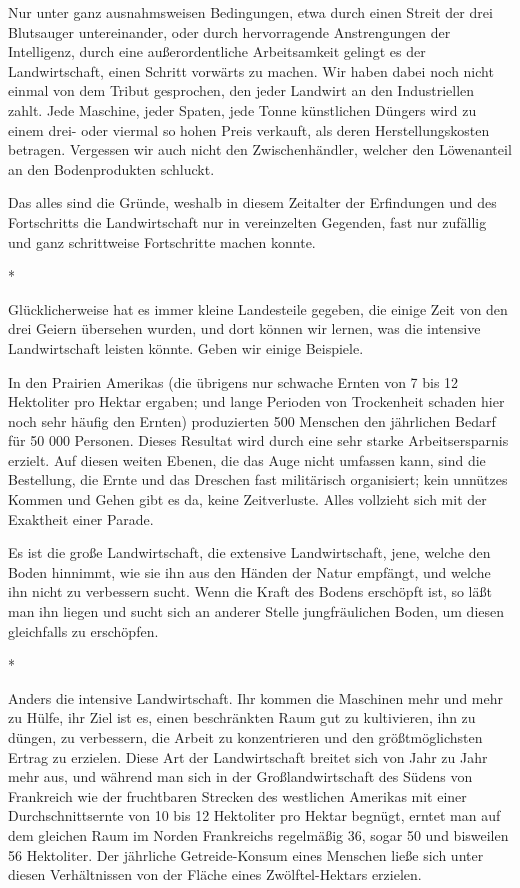 \documentclass{scrbook}
\begin{document}
Nur unter ganz ausnahmsweisen Bedingungen, etwa durch einen Streit der drei Blutsauger untereinander, oder durch hervorragende Anstrengungen der Intelligenz, durch eine außerordentliche Arbeitsamkeit gelingt es der Landwirtschaft, einen Schritt vorwärts zu machen. Wir haben dabei noch nicht einmal von dem Tribut gesprochen, den jeder Landwirt an den Industriellen zahlt. Jede Maschine, jeder Spaten, jede Tonne künstlichen Düngers wird zu einem drei- oder viermal so hohen Preis verkauft, als deren Herstellungskosten betragen. Vergessen wir auch nicht den Zwischenhändler, welcher den Löwenanteil an den Bodenprodukten schluckt.

Das alles sind die Gründe, weshalb in diesem Zeitalter der Erfindungen und des Fortschritts die Landwirtschaft nur in vereinzelten Gegenden, fast nur zufällig und ganz schrittweise Fortschritte machen konnte.

\begin{center}*\end{center}

Glücklicherweise hat es immer kleine Landesteile gegeben, die einige Zeit von den drei Geiern übersehen wurden, und dort können wir lernen, was die intensive Landwirtschaft leisten könnte. Geben wir einige Beispiele.

In den Prairien Amerikas (die übrigens nur schwache Ernten von 7 bis 12 Hektoliter pro Hektar ergaben; und lange Perioden von Trockenheit schaden hier noch sehr häufig den Ernten) produzierten 500 Menschen den jährlichen Bedarf für 50 000 Personen. Dieses Resultat wird durch eine sehr starke Arbeitsersparnis erzielt. Auf diesen weiten Ebenen, die das Auge nicht umfassen kann, sind die Bestellung, die Ernte und das Dreschen fast militärisch organisiert; kein unnützes Kommen und Gehen gibt es da, keine Zeitverluste. Alles vollzieht sich mit der Exaktheit einer Parade.

Es ist die große Landwirtschaft, die extensive Landwirtschaft, jene, welche den Boden hinnimmt, wie sie ihn aus den Händen der Natur empfängt, und welche ihn nicht zu verbessern sucht. Wenn die Kraft des Bodens erschöpft ist, so läßt man ihn liegen und sucht sich an anderer Stelle jungfräulichen Boden, um diesen gleichfalls zu erschöpfen.

\begin{center}*\end{center}

Anders die intensive Landwirtschaft. Ihr kommen die Maschinen mehr und mehr zu Hülfe, ihr Ziel ist es, einen beschränkten Raum gut zu kultivieren, ihn zu düngen, zu verbessern, die Arbeit zu konzentrieren und den größtmöglichsten Ertrag zu erzielen. Diese Art der Landwirtschaft breitet sich von Jahr zu Jahr mehr aus, und während man sich in der Großlandwirtschaft des Südens von Frankreich wie der fruchtbaren Strecken des westlichen Amerikas mit einer Durchschnittsernte von 10 bis 12 Hektoliter pro Hektar begnügt, erntet man auf dem gleichen Raum im Norden Frankreichs regelmäßig 36, sogar 50 und bisweilen 56 Hektoliter. Der jährliche Getreide-Konsum eines Menschen ließe sich unter diesen Verhältnissen von der Fläche eines Zwölftel-Hektars erzielen.
\end{document}
